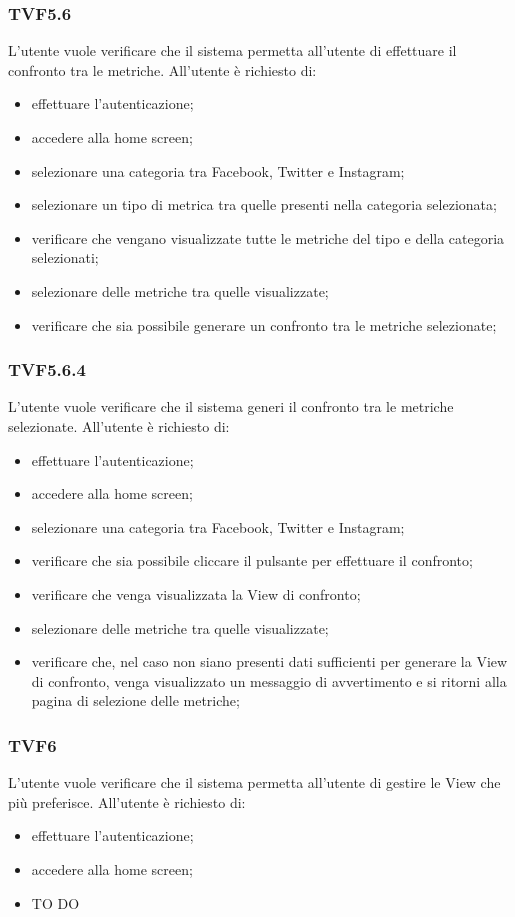 		\subsubsection{TVF5.6}
			L'utente vuole verificare che il sistema permetta all'utente di effettuare il confronto tra le metriche. All'utente è richiesto di:
			\begin{itemize}
				\item effettuare l'autenticazione;
				\item accedere alla home screen;
				\item selezionare una categoria tra Facebook, Twitter e Instagram;
				\item selezionare un tipo di metrica tra quelle presenti nella categoria selezionata;
				\item verificare che vengano visualizzate tutte le metriche del tipo e della categoria selezionati;
				\item selezionare delle metriche tra quelle visualizzate;
				\item verificare che sia possibile generare un confronto tra le metriche selezionate;
			\end{itemize}
			
		\subsubsection{TVF5.6.4}
			L'utente vuole verificare che il sistema generi il confronto tra le metriche selezionate. All'utente è richiesto di:
			\begin{itemize}
				\item effettuare l'autenticazione;
				\item accedere alla home screen;
				\item selezionare una categoria tra Facebook, Twitter e Instagram;
				\item verificare che sia possibile cliccare il pulsante per effettuare il confronto;
				\item verificare che venga visualizzata la View di confronto;
				\item selezionare delle metriche tra quelle visualizzate;
				\item verificare che, nel caso non siano presenti dati sufficienti per generare la View di confronto, venga visualizzato un messaggio di avvertimento e si ritorni alla pagina di selezione delle metriche;
			\end{itemize}
			
		\subsubsection{TVF6}
			L'utente vuole verificare che il sistema permetta all'utente di gestire le View che più preferisce. All'utente è richiesto di:
			\begin{itemize}
				\item effettuare l'autenticazione;
				\item accedere alla home screen;
				\item TO DO
			\end{itemize}
			
